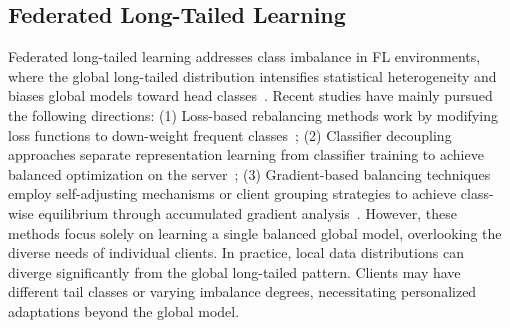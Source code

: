 \documentclass[10pt,twocolumn,letterpaper]{article}
\begin{document}
\subsection{Federated Long-Tailed Learning}


Federated long-tailed learning addresses class imbalance in FL environments, where the global long-tailed distribution intensifies statistical heterogeneity and biases global models toward head classes~\cite{li2020federated,zhang2024long, luo2025long, lt2026hong, Shang_2025_ICCV}. Recent studies have mainly pursued the following directions: (1) Loss-based rebalancing methods work by modifying loss functions to down-weight frequent classes~\cite{sarkar2020fed,wang2021ratioloss,Yan_2025_ICCV}; (2) Classifier decoupling approaches separate representation learning from classifier training to achieve balanced optimization on the server~\cite{shang2022federated}; (3) Gradient-based balancing techniques employ self-adjusting mechanisms or client grouping strategies to achieve class-wise equilibrium through accumulated gradient analysis~\cite{Fed-Grab,zeng2023gbme}. However, these methods focus solely on learning a single balanced global model, overlooking the diverse needs of individual clients. In practice, local data distributions can diverge significantly from the global long-tailed pattern. Clients may have different tail classes or varying imbalance degrees, necessitating personalized adaptations beyond the global model.
\end{document}
